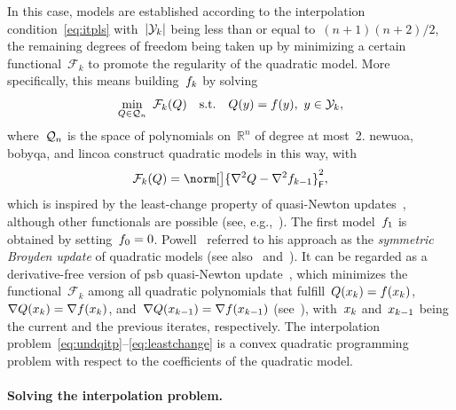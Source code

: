 \documentclass{article}
\numberwithin{equation}{section}
\theoremstyle{definition}
\theoremstyle{plain}
\theoremstyle{remark}
\newcommand*{\R}{\mathbb{R}}
\newcommand*{\abs}[2][]{#1\lvert#2#1\rvert}
\newcommand{\st}{\text{s.t.}}
\newcommand{\frob}{\mathsf{F}}
\newcommand{\func}{\mathcal{F}}
\newcommand{\iter}[1][k]{x\ifthenelse{\equal{#1}{}}{}{_{#1}}}
\newcommand{\objm}[1][k]{\obj\ifthenelse{\equal{#1}{}}{}{_{#1}}}
\newcommand{\obj}{f}
\newcommand{\qspace}[1][n]{\mathcal{Q}\ifthenelse{\equal{#1}{}}{}{_{#1}}}
\newcommand{\xpt}[1][k]{\mathcal{Y}\ifthenelse{\equal{#1}{}}{}{_{#1}}}
\begin{document}
In this case, models are established according to the interpolation condition~\eqref{eq:itpls} with~$\abs{\xpt}$ being less than or equal to~$(n + 1)(n + 2) / 2$, the remaining degrees of freedom being taken up by minimizing a certain functional~$\func_k$ to promote the regularity of the quadratic model.
More specifically, this means building~$\objm$ by solving
\begin{equation}
    \label{eq:undqitp}
        \min_{Q \in \qspace} ~ \func_k(Q) \quad \st \quad Q(y) = \obj(y), ~ y \in \xpt,
\end{equation}
where~$\qspace$ is the space of polynomials on~$\R^n$ of degree at most~\num{2}.
\Gls{newuoa}, \gls{bobyqa}, and \gls{lincoa} construct quadratic models in this way, with
\begin{equation}
    \label{eq:leastchange}
    \func_k(Q) = \norm[\big]{\nabla^2 Q - \nabla^2 \objm[k - 1]}_{\frob}^2,
\end{equation}
which is inspired by the least-change property of quasi-Newton updates~\cite{Dennis_Schnabel_1979}, although other functionals are possible (see, e.g.,~\cite{Conn_Toint_1996,Bandeira_Scheinberg_Vicente_2012,Powell_2013,Zhang_2014,Xie_Yuan_2023}).
The first model~$\objm[1]$ is obtained by setting~$\objm[0] = 0$.
Powell~\cite{Powell_2013} referred to his approach as the \emph{symmetric Broyden update} of quadratic models (see also~\cite[\S~3.6]{Zhang_2012} and~\cite[\S~2.4.2]{Ragonneau_2022}).
It can be regarded as a derivative-free version of \gls{psb} quasi-Newton update~\cite{Powell_1970b}, which minimizes the functional~$\func_k$ among all quadratic polynomials that fulfill~$Q(\iter) = \obj(\iter)$, $\nabla Q(\iter) = \nabla \obj(\iter)$, and~$\nabla Q(\iter[k - 1]) = \nabla \obj(\iter[k - 1])$ (see~\cite[Theorem~4.2]{Dennis_Schnabel_1979}), with~$\iter$ and~$\iter[k - 1]$ being the current and the previous iterates, respectively.
The interpolation problem~\eqref{eq:undqitp}--\eqref{eq:leastchange} is a convex quadratic programming problem with respect to the coefficients of the quadratic model.

\paragraph{Solving the interpolation problem.}
\end{document}
